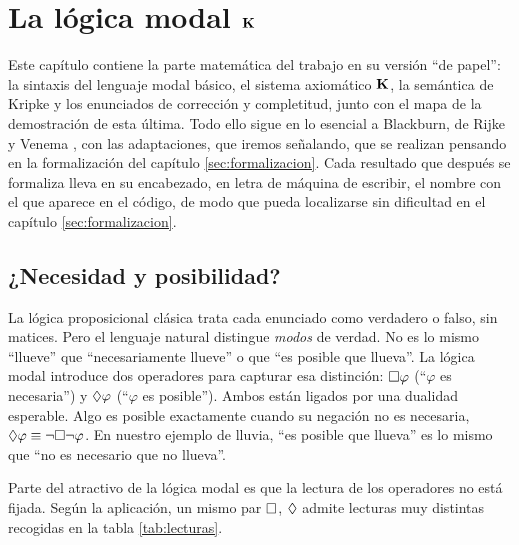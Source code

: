\chapter{La lógica modal \texorpdfstring{$\mathbf{K}$}{K}}\label{sec:logicamodal}

Este capítulo contiene la parte matemática del trabajo en su versión ``de papel'': la sintaxis del lenguaje modal básico, el sistema axiomático $\mathbf{K}$, la semántica de Kripke y los enunciados de corrección y completitud, junto con el mapa de la demostración de esta última. Todo ello sigue en lo esencial a Blackburn, de Rijke y Venema \cite{blackburn}, con las adaptaciones, que iremos señalando, que se realizan pensando en la formalización del capítulo \ref{sec:formalizacion}. Cada resultado que después se formaliza lleva en su encabezado, en letra de máquina de escribir, el nombre con el que aparece en el código, de modo que pueda localizarse sin dificultad en el capítulo \ref{sec:formalizacion}.

\section{¿Necesidad y posibilidad?}

La lógica proposicional clásica trata cada enunciado como verdadero o falso, sin matices. Pero el lenguaje natural distingue \emph{modos} de verdad. No es lo mismo ``llueve'' que ``necesariamente llueve'' o que ``es posible que llueva''. La lógica modal introduce dos operadores para capturar esa distinción: $\square\varphi$ (``$\varphi$ es necesaria'') y $\lozenge\varphi$ (``$\varphi$ es posible''). Ambos están ligados por una dualidad esperable. Algo es posible exactamente cuando su negación no es necesaria, $\lozenge\varphi \equiv \lnot\square\lnot\varphi$. En nuestro ejemplo de lluvia, ``es posible que llueva'' es lo mismo que ``no es necesario que no llueva''.

Parte del atractivo de la lógica modal es que la lectura de los operadores no está fijada. Según la aplicación, un mismo par $\square$, $\lozenge$ admite lecturas muy distintas recogidas en la tabla \ref{tab:lecturas}.

